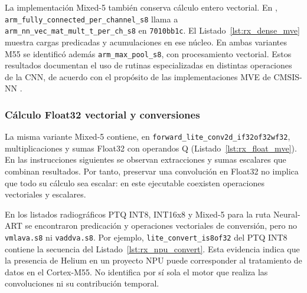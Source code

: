 La implementación Mixed-5 también conserva cálculo entero vectorial. En , \texttt{arm\_\allowbreak fully\_\allowbreak connected\_\allowbreak per\_\allowbreak channel\_\allowbreak s8} llama a \texttt{arm\_\allowbreak nn\_\allowbreak vec\_\allowbreak mat\_\allowbreak mult\_\allowbreak t\_\allowbreak per\_\allowbreak ch\_\allowbreak s8} en \texttt{7010bb1c}. El Listado~\ref{lst:rx_dense_mve} muestra cargas predicadas y acumulaciones en ese núcleo. En ambas variantes M55 se identificó además \texttt{arm\_\allowbreak max\_\allowbreak pool\_\allowbreak s8}, con procesamiento vectorial. Estos resultados documentan el uso de rutinas especializadas en distintas operaciones de la CNN, de acuerdo con el propósito de las implementaciones MVE de CMSIS-NN \cite{cap4_cmsisnn}.


\noindent\begin{minipage}{\linewidth}

\end{minipage}

\subsubsection{Cálculo Float32 vectorial y conversiones}
La misma variante Mixed-5 contiene, en \texttt{forward\_\allowbreak lite\_\allowbreak conv2d\_\allowbreak if32of32wf32}, multiplicaciones y sumas Float32 con operandos Q (Listado~\ref{lst:rx_float_mve}). En las instrucciones siguientes se observan extracciones y sumas escalares que combinan resultados. Por tanto, preservar una convolución en Float32 no implica que todo su cálculo sea escalar: en este ejecutable coexisten operaciones vectoriales y escalares.


\noindent\begin{minipage}{\linewidth}

\end{minipage}

En los listados radiográficos PTQ INT8, INT16x8 y Mixed-5 para la ruta Neural-ART se encontraron predicación y operaciones vectoriales de conversión, pero no \texttt{vmlava.s8} ni \texttt{vaddva.s8}. Por ejemplo, \texttt{lite\_\allowbreak convert\_\allowbreak is8of32} del PTQ INT8 contiene la secuencia del Listado~\ref{lst:rx_npu_convert}. Esta evidencia indica que la presencia de Helium en un proyecto NPU puede corresponder al tratamiento de datos en el Cortex-M55. No identifica por sí sola el motor que realiza las convoluciones ni su contribución temporal.


